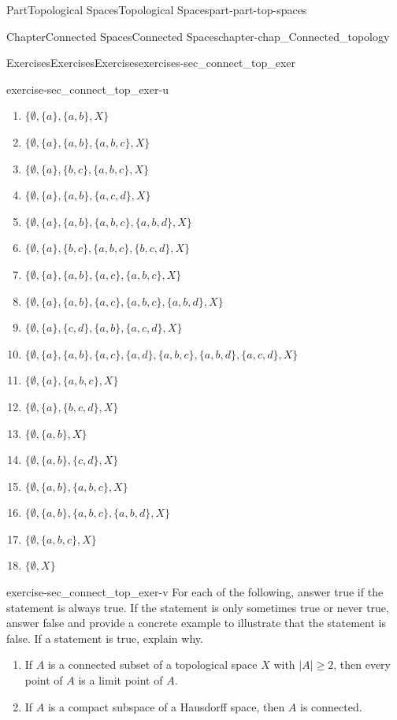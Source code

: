 \documentclass[oneside,10pt,]{book}
\numberwithin{equation}{chapter}
\begin{document}
\begin{partptx}{Part}{Topological Spaces}{}{Topological Spaces}{}{}{part-part-top-spaces}
\begin{chapterptx}{Chapter}{Connected Spaces}{}{Connected Spaces}{}{}{chapter-chap_Connected_topology}
\begin{exercises-section}{Exercises}{Exercises}{}{Exercises}{}{}{exercises-sec_connect_top_exer}
\begin{divisionexercise}{21}{}{}{exercise-sec_connect_top_exer-u}
\begin{enumerate}[font=\bfseries,label=(\alph*),ref=\alph*]
\item{}\(\{\emptyset, \{a\}, \{a,b\}, X\}\)%
\item{}\(\{\emptyset, \{a\}, \{a,b\}, \{a,b,c\}, X\}\)%
\item{}\(\{\emptyset, \{a\}, \{b,c\}, \{a,b,c\}, X\}\)%
\item{}\(\{\emptyset, \{a\}, \{a,b\}, \{a,c,d\}, X\}\)%
\item{}\(\{\emptyset, \{a\}, \{a,b\}, \{a,b,c\}, \{a,b,d\}, X\}\)%
\item{}\(\{\emptyset, \{a\}, \{b,c\}, \{a,b,c\}, \{b,c,d\}, X\}\)%
\item{}\(\{\emptyset, \{a\}, \{a,b\}, \{a,c\}, \{a,b,c\}, X\}\)%
\item{}\(\{\emptyset, \{a\}, \{a,b\}, \{a,c\}, \{a,b,c\}, \{a,b,d\}, X\}\)%
\item{}\(\{\emptyset, \{a\}, \{c,d\}, \{a,b\}, \{a,c,d\}, X\}\)%
\item{}\(\{\emptyset, \{a\}, \{a,b\}, \{a,c\}, \{a,d\}, \{a,b,c\}, \{a,b,d\}, \{a,c,d\}, X\}\)%
\item{}\(\{\emptyset, \{a\}, \{a,b,c\}, X\}\)%
\item{}\(\{\emptyset, \{a\}, \{b,c,d\}, X\}\)%
\item{}\(\{\emptyset, \{a,b\}, X\}\)%
\item{}\(\{\emptyset, \{a,b\}, \{c,d\}, X\}\)%
\item{}\(\{\emptyset, \{a,b\}, \{a,b,c\}, X\}\)%
\item{}\(\{\emptyset, \{a,b\}, \{a,b,c\}, \{a,b,d\}, X\}\)%
\item{}\(\{\emptyset, \{a,b,c\}, X\}\)%
\item{}\(\{\emptyset, X\}\)%
\end{enumerate}%
\end{divisionexercise}%
\begin{divisionexercise}{22}{}{}{exercise-sec_connect_top_exer-v}%
For each of the following, answer true if the statement is always true. If the statement is only sometimes true or never true, answer false and provide a concrete example to illustrate that the statement is false. If a statement is true, explain why.%
\begin{enumerate}[font=\bfseries,label=(\alph*),ref=\alph*]%
\item{}If \(A\) is a connected subset of a topological space \(X\) with \(|A| \geq 2\), then every point of \(A\) is a limit point of \(A\).%
\item{}If \(A\) is a compact subspace of a Hausdorff space, then \(A\) is connected.%

\end{enumerate}
\end{divisionexercise}
\end{exercises-section}
\end{chapterptx}
\end{partptx}
\end{document}
